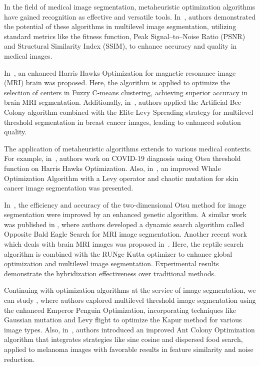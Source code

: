 \documentclass{elsarticle}
\begin{document}
In the field of medical image segmentation, metaheuristic optimization algorithms have gained recognition as effective and versatile tools. In~\cite{Abualigah2023}, authors demonstrated the potential of these algorithms in multilevel image segmentation, utilizing standard metrics like the fitness function, Peak Signal--to--Noise Ratio (PSNR) and Structural Similarity Index (SSIM), to enhance accuracy and quality in medical images.

In~\cite{Iswisi2021}, an enhanced Harris Hawks Optimization for magnetic resonance image (MRI) brain was proposed. Here, the algorithm is applied to optimize the selection of centers in Fuzzy C-means clustering, achieving superior accuracy in brain MRI segmentation. Additionally, in~\cite{Xing2023}, authors applied the Artificial Bee Colony algorithm combined with the Elite Levy Spreading strategy for multilevel threshold segmentation in breast cancer images, leading to enhanced solution quality. 

The application of metaheuristic algorithms extends to various medical contexts. For example, in~\cite{Ryalat2022}, authors work on COVID-19 diagnosis using Otsu threshold function on Harris Hawks Optimization. Also, in~\cite{Weizhu2022}, an improved Whale Optimization Algorithm with a Levy operator and chaotic mutation for skin cancer image segmentation was presented.

In~\cite{Peng2023}, the efficiency and accuracy of the two-dimensional Otsu method for image segmentation were improved by an enhanced genetic algorithm. A similar work was published in \cite{Sharma2023}, where authors developed a dynamic search algorithm called Opposite Bald Eagle Search for MRI image segmentation. Another recent work which deals with brain MRI images was proposed in~\cite{Emam2023}. Here, the reptile search algorithm is combined with the RUNge Kutta optimizer to enhance global optimization and multilevel image segmentation. Experimental results demonstrate the hybridization effectiveness over traditional methods.

Continuing with optimization algorithms at the service of image segmentation, we can study \cite{Xing2020}, where authors explored multilevel threshold image segmentation using the enhanced Emperor Penguin Optimization, incorporating techniques like Gaussian mutation and Levy flight to optimize the Kapur method for various image types. Also, in~\cite{Zhao2023}, authors introduced an improved Ant Colony Optimization algorithm that integrates strategies like sine cosine and dispersed food search, applied to melanoma images with favorable results in feature similarity and noise reduction.
\end{document}
